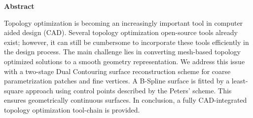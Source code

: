 

\clearemptydoublepage
{}
{}	





\vspace*{2cm}
\begin{center}
{\Large \bf Abstract}
\end{center}
\vspace{1cm}

Topology optimization is becoming an increasingly important tool in computer aided design (CAD). Several topology optimization open-source tools already exist; however,  it can still be cumbersome to incorporate these tools efficiently in the design process. The main challenge lies in converting mesh-based topology optimized solutions to a smooth geometry representation. We address this issue with a two-stage Dual Contouring surface reconstruction scheme for coarse parametrization patches and fine vertices. A B-Spline surface is fitted by a least-square approach using control points described by the Peters' scheme. This ensures geometrically continuous surfaces. In conclusion, a fully CAD-integrated topology optimization tool-chain is provided.
